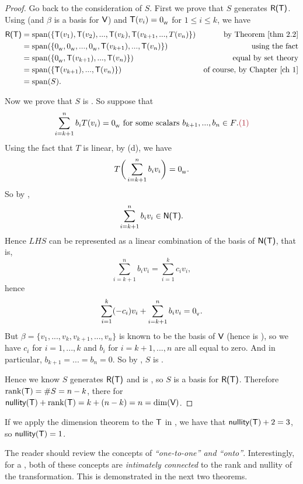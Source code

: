\begin{proof}
Go back to the consideration of \(S\).
First we prove that \(S\) generates \(\textsf{R(T)}\).
Using  (and \(\beta\) is a basis for \(\textsf{V}\)) and  \(\textsf{T}(v_i) = 0_{_{\textsf{W}}}\) for \(1 \le i \le k\), we have
\begin{align*}
    \RANGET & = \spann(\{ \T(v_1), \T(v_2), ..., \T(v_{k}), \T(v_{k + 1}, ..., T(v_n) \}) & \text{by \THM{2.2}} \\
            & = \spann(\{ \OW, \OW, ..., \OW, \T(v_{k + 1}), ..., \T(v_{n}) \}) & \text{using the fact} \\
            & = \spann(\{ \OW, \T(v_{k + 1}), ..., \T(v_{n}) \}) & \text{equal by set theory} \\
            & = \spann(\{ \T(v_{k + 1}), ..., \T(v_{n}) \}) & \text{of course, by \CH{1}} \\
            & = \spann(S).
\end{align*}

Now we prove that \(S\) is \LID{}.
So suppose that
\[
    \sum_{i = k + 1}^n b_i T(v_i) = \OW \text{ for some scalars \(b_{k + 1}, ..., b_n \in F\)}. \MAROON{(1)}
\]
Using the fact that \(T\) is linear, by (d), we have
\[
    T\bigg( \sum_{i = k + 1}^n b_i v_i \bigg) = 0_{_{\textsf{W}}}.
\]
So by ,
\[
    \sum_{i = k + 1}^n b_i v_i \in \textsf{N(T)}.
\]
Hence \(LHS\) can be represented as a linear combination of the basis of \(\textsf{N(T)}\), that is,
\[
    \sum_{i = k + 1}^n b_i v_i = \sum_{i = 1}^k c_i v_i,
\]
hence
\[
    \sum_{i = 1}^k (-c_i) v_i + \sum_{i = k + 1}^n b_i v_i = 0_{_{\textsf{V}}}.
\]
But \(\beta = \{ v_1, ..., v_k, v_{k + 1}, ..., v_n \}\) is known to be the basis of \(\textsf{V}\) (hence is \LID{}), so we have \(c_i\) for \(i = 1, ..., k\) and \(b_i\) for \(i = k + 1, ..., n\) are all equal to zero.
And in particular, \(b_{k + 1} = ... = b_n = 0\).
So by , \(S\) is \LID{}.

Hence we know \(S\) generates \(\textsf{R(T)}\) and is \LID{}, so \(S\) is a basis for \(\textsf{R(T)}\).
Therefore \(\mathrm{rank}(\textsf{T}) = \#S = n - k\), there for \(\textsf{nullity}(\textsf{T}) + \mathrm{rank}(\textsf{T}) = k + (n - k) = n = \dim(\textsf{V})\).
\end{proof}

\begin{note}
If we apply the dimension theorem to the \LTRAN{} \(\textsf{T}\) in , we have that \(\textsf{nullity}(\textsf{T}) + 2 = 3\), so \(\textsf{nullity}(\textsf{T}) = 1\).
\end{note}

\begin{remark} \label{remark 2.1.8}
The reader should review the concepts of \emph{``one-to-one'' and ``onto''}.
Interestingly, for a \LTRAN{}, both of these concepts are \emph{intimately connected} to the rank and nullity of the transformation.
This is demonstrated in the next two theorems.
\end{remark}

